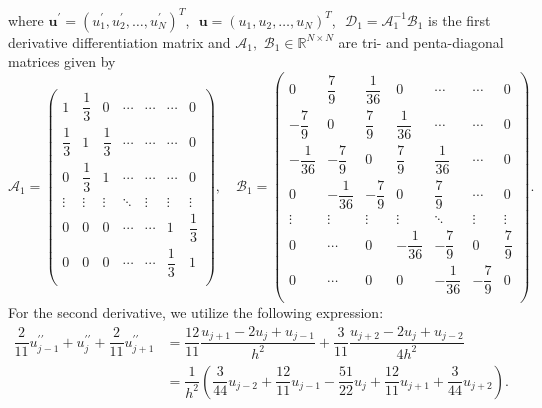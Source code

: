 \documentclass[11pt,a4paper]{amsart}
\theoremstyle{plain}
\theoremstyle{definition}
\theoremstyle{remark}
\numberwithin{equation}{section}
\begin{document}
where $ \mathbf{u}^{\prime} = (u^{\prime}_1, u^{\prime}_2, \dots, u^{\prime}_N)^T $,\,\, $ \mathbf{u} = (u_1, u_2, \dots, u_N)^T $,\,\, $ \mathcal{D}_1 = \mathcal{A}_1^{-1} \mathcal{B}_1 $ is the first derivative differentiation matrix and $ \mathcal{A}_1,\,\, \mathcal{B}_1 \in \mathbb{R}^{N \times N} $ are tri- and penta-diagonal matrices given by
\begin{equation} 
\mathcal{A}_1 = 
\begin{pmatrix}
1 & \dfrac{1}{3} & 0 & \cdots & \cdots & \cdots & 0 \\[0.3cm]
\dfrac{1}{3} & 1 & \dfrac{1}{3} & \cdots & \cdots & \cdots & 0 \\[0.3cm]
0 & \dfrac{1}{3} & 1 & \cdots & \cdots & \cdots & 0 \\[0.1cm]
\vdots & \vdots & \vdots & \ddots & \vdots & \vdots & \vdots \\[0.3cm]
0 & 0 & 0 & \cdots & \cdots & 1 & \dfrac{1}{3} \\[0.3cm]
0 & 0 & 0 & \cdots & \cdots & \dfrac{1}{3} & 1 \\
\end{pmatrix}
, \quad \mathcal{B}_1 =
\begin{pmatrix}
0 & \dfrac{7}{9} & \dfrac{1}{36} & 0 & \cdots & \cdots & 0 \\[0.3cm]
-\dfrac{7}{9} & 0 & \dfrac{7}{9} & \dfrac{1}{36} & \cdots & \cdots & 0 \\[0.3cm]
-\dfrac{1}{36} & -\dfrac{7}{9} & 0 & \dfrac{7}{9} & \dfrac{1}{36} & \cdots & 0 \\[0.3cm]
0 & -\dfrac{1}{36} & -\dfrac{7}{9} & 0 & \dfrac{7}{9} & \cdots & 0 \\[0.3cm]
\vdots & \vdots & \vdots & \vdots & \ddots & \vdots & \vdots \\[0.3cm]
0 & \cdots & 0 & -\dfrac{1}{36} & -\dfrac{7}{9} & 0 & \dfrac{7}{9}\\[0.3cm]
0 & \cdots & 0 & 0 & -\dfrac{1}{36} & -\dfrac{7}{9} & 0 \\
\end{pmatrix}.
\end{equation}
For the second derivative, we utilize the following expression:
\begin{equation}
\label{eqn:2a}
\begin{split}
 \dfrac{2}{11} u^{\prime\prime}_{j-1} + u^{\prime\prime}_{j} + \dfrac{2}{11} u^{\prime\prime}_{j+1} &= \dfrac{12}{11} \dfrac{u_{j+1} - 2u_{j} + u_{j-1}}{h^2} + \dfrac{3}{11} \dfrac{u_{j+2} - 2u_{j} + u_{j-2}}{4h^2}\\ 
 &= \dfrac{1}{h^2} \left(\dfrac{3}{44}u_{j-2} +\dfrac{12}{11}u_{j-1}-\dfrac{51}{22}u_{j}+\dfrac{12}{11}u_{j+1}+\dfrac{3}{44}u_{j+2} \right).
\end{split}
\end{equation}
\end{document}
